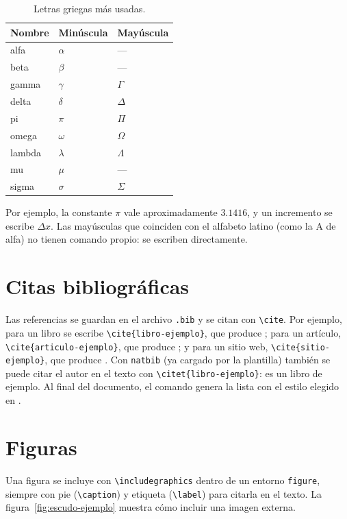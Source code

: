 \begin{table}[htbp]
\centering
\caption[Letras griegas de ejemplo]{Letras griegas más usadas.}
\label{tab:griegas}
\begin{tabular}{lll}
\toprule
Nombre & Minúscula & Mayúscula \\
\midrule
alfa & $\alpha$ & --- \\
beta & $\beta$ & --- \\
gamma & $\gamma$ & $\Gamma$ \\
delta & $\delta$ & $\Delta$ \\
pi & $\pi$ & $\Pi$ \\
omega & $\omega$ & $\Omega$ \\
lambda & $\lambda$ & $\Lambda$ \\
mu & $\mu$ & --- \\
sigma & $\sigma$ & $\Sigma$ \\
\bottomrule
\end{tabular}
\end{table}

Por ejemplo, la constante $\pi$ vale aproximadamente $3.1416$, y un
incremento se escribe $\Delta x$. Las mayúsculas que coinciden con el
alfabeto latino (como la A de alfa) no tienen comando propio: se escriben
directamente.

\section{Citas bibliográficas}

Las referencias se guardan en el archivo \verb|.bib| y se citan con
\verb|\cite|. Por ejemplo, para un libro se escribe
\verb|\cite{libro-ejemplo}|, que produce \cite{libro-ejemplo}; para un
artículo, \verb|\cite{articulo-ejemplo}|, que produce
\cite{articulo-ejemplo}; y para un sitio web,
\verb|\cite{sitio-ejemplo}|, que produce \cite{sitio-ejemplo}. Con
\verb|natbib| (ya cargado por la plantilla) también se puede citar el
autor en el texto con \verb|\citet{libro-ejemplo}|:
\citet{libro-ejemplo} es un libro de ejemplo. Al final del documento, el
comando \verb|| genera la lista con el estilo elegido en
\verb||.

\section{Figuras}

Una figura se incluye con \verb|\includegraphics| dentro de un entorno
\verb|figure|, siempre con pie (\verb|\caption|) y etiqueta
(\verb|\label|) para citarla en el texto. La
figura~\ref{fig:escudo-ejemplo} muestra cómo incluir una imagen externa.

